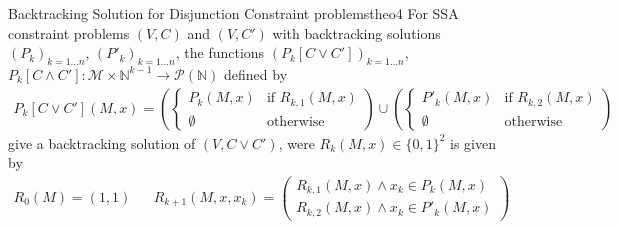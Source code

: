 \begin{theorem}{Backtracking Solution for Disjunction Constraint problems}{theo4}
    For SSA constraint problems $(V,C)$ and $(V,C')$ with backtracking
    solutions $(P_k)_{k=1\dots n}$, $(P'_k)_{k=1\dots n}$, the
    functions $(P_k[C\mathrel\lor C'])_{k=1\dots n}$,
    $P_k[C\mathrel\land C']\colon\mathcal M\times\mathbb N^{k-1}\rightarrow\mathcal P(\mathbb N)$
    defined by
    \begin{align*}
        P_k[C\mathrel\lor C'](M,x)=\left(\left\{
            \begin{array}{ll}
                P_k(M,x)&\text{if }R_{k,1}(M,x)\\
                \emptyset&\text{otherwise}
            \end{array}
            \right)\cup\left(\left\{
            \begin{array}{ll}
                P'_k(M,x)&\text{if }R_{k,2}(M,x)\\
                \emptyset&\text{otherwise}
            \end{array} 
            \right)
    \end{align*}
    give a backtracking solution of $(V,C\mathrel\lor C')$, were $R_k(M,x)\in\{0,1\}^2$
    is given by 
    \begin{align*}
        R_0(M)=(1,1)&&
        R_{k+1}(M,x,x_k)=\left(
            \begin{array}{l}
                R_{k,1}(M,x)\mathrel\land x_k\in P_k(M,x)\\
                R_{k,2}(M,x)\mathrel\land x_k\in P'_k(M,x)
            \end{array}\right)
    \end{align*}
    \tcblower

\end{theorem}
